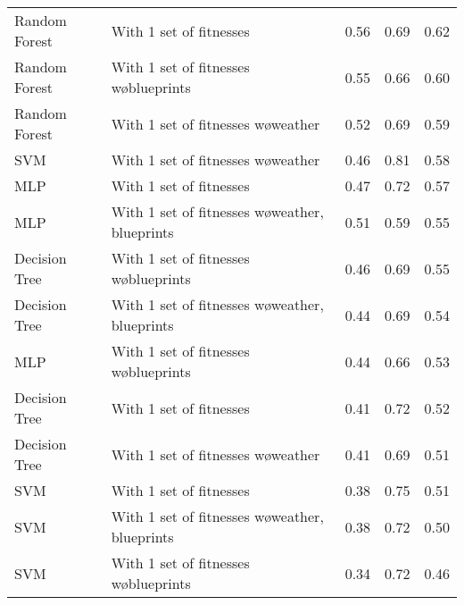 \begin{tabular}{llrrr}
 Random Forest &                         With 1 set of fitnesses &       0.56 &    0.69 & 0.62 \\
 Random Forest &          With 1 set of fitnesses w\o blueprints &       0.55 &    0.66 & 0.60 \\
 Random Forest &             With 1 set of fitnesses w\o weather &       0.52 &    0.69 & 0.59 \\
           SVM &             With 1 set of fitnesses w\o weather &       0.46 &    0.81 & 0.58 \\
           MLP &                         With 1 set of fitnesses &       0.47 &    0.72 & 0.57 \\
           MLP & With 1 set of fitnesses w\o weather, blueprints &       0.51 &    0.59 & 0.55 \\
 Decision Tree &          With 1 set of fitnesses w\o blueprints &       0.46 &    0.69 & 0.55 \\
 Decision Tree & With 1 set of fitnesses w\o weather, blueprints &       0.44 &    0.69 & 0.54 \\
           MLP &          With 1 set of fitnesses w\o blueprints &       0.44 &    0.66 & 0.53 \\
 Decision Tree &                         With 1 set of fitnesses &       0.41 &    0.72 & 0.52 \\
 Decision Tree &             With 1 set of fitnesses w\o weather &       0.41 &    0.69 & 0.51 \\
           SVM &                         With 1 set of fitnesses &       0.38 &    0.75 & 0.51 \\
           SVM & With 1 set of fitnesses w\o weather, blueprints &       0.38 &    0.72 & 0.50 \\
           SVM &          With 1 set of fitnesses w\o blueprints &       0.34 &    0.72 & 0.46 \\
\bottomrule
\end{tabular}
